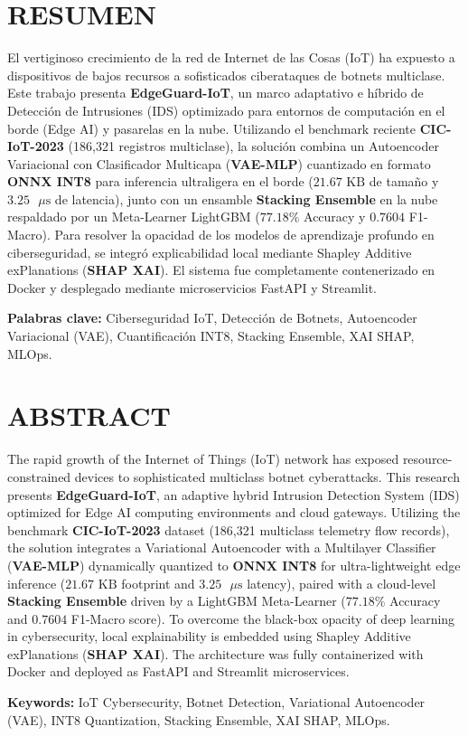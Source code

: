 \thispagestyle{plain}
\section{RESUMEN}

\vspace{0.3cm}

El vertiginoso crecimiento de la red de Internet de las Cosas (IoT) ha expuesto a dispositivos de bajos recursos a sofisticados ciberataques de botnets multiclase. Este trabajo presenta \textbf{EdgeGuard-IoT}, un marco adaptativo e híbrido de Detección de Intrusiones (IDS) optimizado para entornos de computación en el borde (Edge AI) y pasarelas en la nube. Utilizando el benchmark reciente \textbf{CIC-IoT-2023} (186,321 registros multiclase), la solución combina un Autoencoder Variacional con Clasificador Multicapa (\textbf{VAE-MLP}) cuantizado en formato \textbf{ONNX INT8} para inferencia ultraligera en el borde ($21.67\text{ KB}$ de tamaño y $3.25\text{ }\mu\text{s}$ de latencia), junto con un ensamble \textbf{Stacking Ensemble} en la nube respaldado por un Meta-Learner LightGBM ($77.18\%$ Accuracy y $0.7604$ F1-Macro). Para resolver la opacidad de los modelos de aprendizaje profundo en ciberseguridad, se integró explicabilidad local mediante Shapley Additive exPlanations (\textbf{SHAP XAI}). El sistema fue completamente contenerizado en Docker y desplegado mediante microservicios FastAPI y Streamlit.

\vspace{0.4cm}
\noindent\textbf{Palabras clave:} Ciberseguridad IoT, Detección de Botnets, Autoencoder Variacional (VAE), Cuantificación INT8, Stacking Ensemble, XAI SHAP, MLOps.

\newpage
\thispagestyle{plain}
\section{ABSTRACT}

\vspace{0.3cm}

The rapid growth of the Internet of Things (IoT) network has exposed resource-constrained devices to sophisticated multiclass botnet cyberattacks. This research presents \textbf{EdgeGuard-IoT}, an adaptive hybrid Intrusion Detection System (IDS) optimized for Edge AI computing environments and cloud gateways. Utilizing the benchmark \textbf{CIC-IoT-2023} dataset (186,321 multiclass telemetry flow records), the solution integrates a Variational Autoencoder with a Multilayer Classifier (\textbf{VAE-MLP}) dynamically quantized to \textbf{ONNX INT8} for ultra-lightweight edge inference ($21.67\text{ KB}$ footprint and $3.25\text{ }\mu\text{s}$ latency), paired with a cloud-level \textbf{Stacking Ensemble} driven by a LightGBM Meta-Learner ($77.18\%$ Accuracy and $0.7604$ F1-Macro score). To overcome the black-box opacity of deep learning in cybersecurity, local explainability is embedded using Shapley Additive exPlanations (\textbf{SHAP XAI}). The architecture was fully containerized with Docker and deployed as FastAPI and Streamlit microservices.

\vspace{0.4cm}
\noindent\textbf{Keywords:} IoT Cybersecurity, Botnet Detection, Variational Autoencoder (VAE), INT8 Quantization, Stacking Ensemble, XAI SHAP, MLOps.
